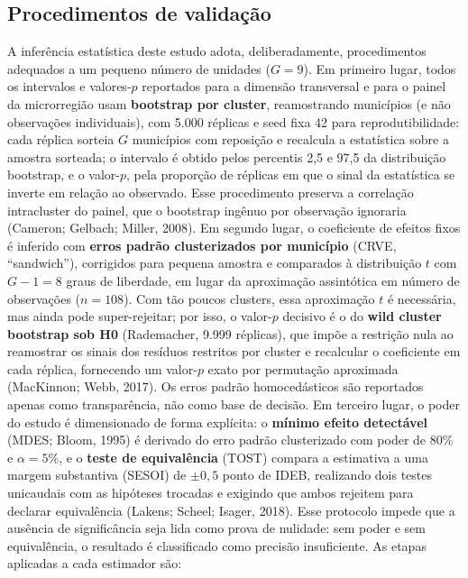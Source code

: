 \documentclass[12pt,a4paper]{article}
\begin{document}
\subsection{Procedimentos de validação}
A inferência estatística deste estudo adota, deliberadamente, procedimentos adequados a um pequeno número de unidades ($G = 9$). Em primeiro lugar, todos os intervalos e valores-$p$ reportados para a dimensão transversal e para o painel da microrregião usam \textbf{bootstrap por cluster}, reamostrando municípios (e não observações individuais), com 5.000 réplicas e seed fixa 42 para reprodutibilidade: cada réplica sorteia $G$ municípios com reposição e recalcula a estatística sobre a amostra sorteada; o intervalo é obtido pelos percentis 2,5 e 97,5 da distribuição bootstrap, e o valor-$p$, pela proporção de réplicas em que o sinal da estatística se inverte em relação ao observado. Esse procedimento preserva a correlação intracluster do painel, que o bootstrap ingênuo por observação ignoraria (Cameron; Gelbach; Miller, 2008).
Em segundo lugar, o coeficiente de efeitos fixos é inferido com \textbf{erros padrão clusterizados por município} (CRVE, ``sandwich''), corrigidos para pequena amostra e comparados à distribuição $t$ com $G-1 = 8$ graus de liberdade, em lugar da aproximação assintótica em número de observações ($n = 108$). Com tão poucos clusters, essa aproximação $t$ é necessária, mas ainda pode super-rejeitar; por isso, o valor-$p$ decisivo é o do \textbf{wild cluster bootstrap sob H0} (Rademacher, 9.999 réplicas), que impõe a restrição nula ao reamostrar os sinais dos resíduos restritos por cluster e recalcular o coeficiente em cada réplica, fornecendo um valor-$p$ exato por permutação aproximada (MacKinnon; Webb, 2017). Os erros padrão homocedásticos são reportados apenas como transparência, não como base de decisão.
Em terceiro lugar, o poder do estudo é dimensionado de forma explícita: o \textbf{mínimo efeito detectável} (MDES; Bloom, 1995) é derivado do erro padrão clusterizado com poder de 80\% e $\alpha = 5\%$, e o \textbf{teste de equivalência} (TOST) compara a estimativa a uma margem substantiva (SESOI) de $\pm 0{,}5$ ponto de IDEB, realizando dois testes unicaudais com as hipóteses trocadas e exigindo que ambos rejeitem para declarar equivalência (Lakens; Scheel; Isager, 2018). Esse protocolo impede que a ausência de significância seja lida como prova de nulidade: sem poder e sem equivalência, o resultado é classificado como precisão insuficiente. As etapas aplicadas a cada estimador são:
\end{document}
